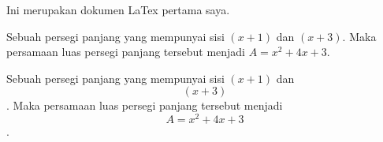 \documentclass[11pt]{article}
\begin{document}
Ini merupakan dokumen LaTex pertama saya.

Sebuah persegi panjang yang mempunyai sisi $(x+1)$ dan $(x+3)$. Maka persamaan luas persegi panjang tersebut menjadi $A=x^2+4x+3$.

Sebuah persegi panjang yang mempunyai sisi $(x+1)$ dan $$(x+3)$$. Maka persamaan luas persegi panjang tersebut menjadi $$A=x^2+4x+3$$. 
\end{document}
